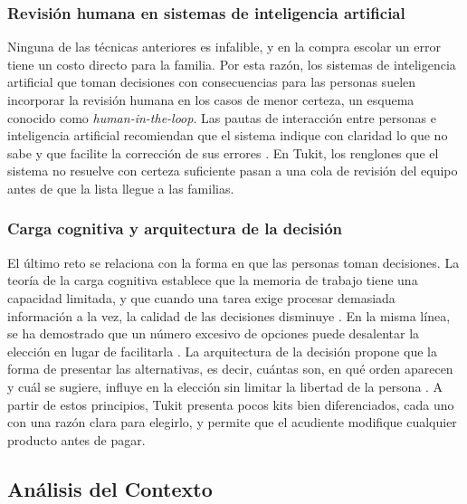 \subsubsection{Revisión humana en sistemas de inteligencia artificial}

Ninguna de las técnicas anteriores es infalible, y en la compra escolar un error tiene un
costo directo para la familia. Por esta razón, los sistemas de inteligencia artificial que
toman decisiones con consecuencias para las personas suelen incorporar la revisión humana
en los casos de menor certeza, un esquema conocido como \emph{human-in-the-loop}. Las pautas
de interacción entre personas e inteligencia artificial recomiendan que el sistema indique
con claridad lo que no sabe y que facilite la corrección de sus errores
\citep{amershi_guidelines_2019}. En Tukit, los renglones que el sistema no resuelve con
certeza suficiente pasan a una cola de revisión del equipo antes de que la lista llegue a
las familias.\par

\subsubsection{Carga cognitiva y arquitectura de la decisión}

El último reto se relaciona con la forma en que las personas toman decisiones. La teoría de
la carga cognitiva establece que la memoria de trabajo tiene una capacidad limitada, y que
cuando una tarea exige procesar demasiada información a la vez, la calidad de las decisiones
disminuye \citep{sweller_cognitive_2011}. En la misma línea, se ha demostrado que un número
excesivo de opciones puede desalentar la elección en lugar de facilitarla
\citep{iyengar_when_2000}. La arquitectura de la decisión propone que la forma de presentar
las alternativas, es decir, cuántas son, en qué orden aparecen y cuál se sugiere, influye en
la elección sin limitar la libertad de la persona \citep{thaler_nudge_2008}. A partir de
estos principios, Tukit presenta pocos kits bien diferenciados, cada uno con una razón clara
para elegirlo, y permite que el acudiente modifique cualquier producto antes de pagar.\par





\subsection{Análisis del Contexto}
\label{sec:analisis-contexto}


